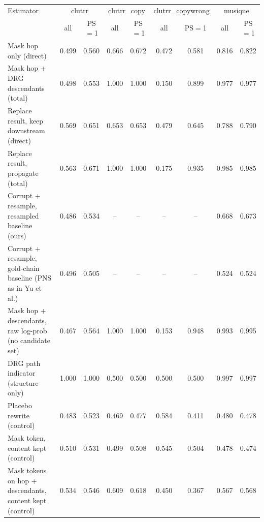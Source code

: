 \begin{tabular}{lcccccccc}
\toprule
Estimator & \multicolumn{2}{c}{clutrr} & \multicolumn{2}{c}{clutrr\_copy} & \multicolumn{2}{c}{clutrr\_copywrong} & \multicolumn{2}{c}{musique} \\
 & all & PS$=$1 & all & PS$=$1 & all & PS$=$1 & all & PS$=$1 \\
\midrule
Mask hop only (direct) & 0.499 & 0.560 & 0.666 & 0.672 & 0.472 & 0.581 & 0.816 & 0.822 \\
Mask hop + DRG descendants (total) & 0.498 & 0.553 & 1.000 & 1.000 & 0.150 & 0.899 & 0.977 & 0.977 \\
Replace result, keep downstream (direct) & 0.569 & 0.651 & 0.653 & 0.653 & 0.479 & 0.645 & 0.788 & 0.790 \\
Replace result, propagate (total) & 0.563 & 0.671 & 1.000 & 1.000 & 0.175 & 0.935 & 0.985 & 0.985 \\
Corrupt + resample, resampled baseline (ours) & 0.486 & 0.534 & -- & -- & -- & -- & 0.668 & 0.673 \\
Corrupt + resample, gold-chain baseline (PNS as in Yu et al.) & 0.496 & 0.505 & -- & -- & -- & -- & 0.524 & 0.524 \\
Mask hop + descendants, raw log-prob (no candidate set) & 0.467 & 0.564 & 1.000 & 1.000 & 0.153 & 0.948 & 0.993 & 0.995 \\
DRG path indicator (structure only) & 1.000 & 1.000 & 0.500 & 0.500 & 0.500 & 0.500 & 0.997 & 0.997 \\
Placebo rewrite (control) & 0.483 & 0.523 & 0.469 & 0.477 & 0.584 & 0.411 & 0.480 & 0.478 \\
Mask token, content kept (control) & 0.510 & 0.531 & 0.499 & 0.508 & 0.545 & 0.504 & 0.478 & 0.474 \\
Mask tokens on hop + descendants, content kept (control) & 0.534 & 0.546 & 0.609 & 0.618 & 0.450 & 0.367 & 0.567 & 0.568 \\
\bottomrule
\end{tabular}

